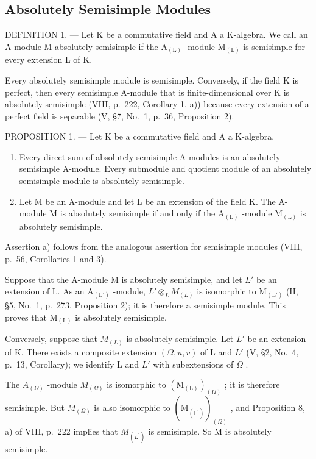 \subsection{Absolutely Semisimple Modules}

DEFINITION 1. --- Let K be a commutative field and A a K-algebra. We call an A-module M absolutely semisimple if the \(\mathrm{A}_{(\mathrm{L})}\) -module \(\mathrm{M}_{(\mathrm{L})}\) is semisimple for every extension L of K.

Every absolutely semisimple module is semisimple. Conversely, if the field K is perfect, then every semisimple A-module that is finite-dimensional over K is absolutely semisimple (VIII, p.~222, Corollary 1, a)) because every extension of a perfect field is separable (V, §7, No.~1, p.~36, Proposition 2).

PROPOSITION 1. --- Let K be a commutative field and A a K-algebra.

\begin{enumerate}
\def\labelenumi{\alph{enumi})}
\item
  Every direct sum of absolutely semisimple A-modules is an absolutely semisimple A-module. Every submodule and quotient module of an absolutely semisimple module is absolutely semisimple.
\item
  Let M be an A-module and let L be an extension of the field K. The A-module M is absolutely semisimple if and only if the \(\mathrm{A}_{(\mathrm{L})}\) -module \(\mathrm{M}_{(\mathrm{L})}\) is absolutely semisimple.
\end{enumerate}

Assertion a) follows from the analogous assertion for semisimple modules (VIII, p.~56, Corollaries 1 and 3).

Suppose that the A-module M is absolutely semisimple, and let \(L'\) be an extension of L. As an \(\mathrm{A}_{(\mathrm{L}')}\) -module, \(L' \otimes_{L} M_{(L)}\) is isomorphic to \(\mathrm{M}_{(\mathrm{L}')}\) (II, §5, No.~1, p.~273, Proposition 2); it is therefore a semisimple module. This proves that \(\mathrm{M}_{(\mathrm{L})}\) is absolutely semisimple.

Conversely, suppose that \(M_{(L)}\) is absolutely semisimple. Let \(L'\) be an extension of K. There exists a composite extension \((\Omega, u, v)\) of L and \(L'\) (V, §2, No.~4, p.~13, Corollary); we identify L and \(L'\) with subextensions of \(\Omega\) .

The \(A_{(\Omega)}\) -module \(M_{(\Omega)}\) is isomorphic to \((\mathrm{M}_{(\mathrm{L})})_{(\Omega)}\) ; it is therefore semisimple. But \(M_{(\Omega)}\) is also isomorphic to \((\mathrm{M}_{(\mathrm{L}^{\prime})})_{(\Omega)}\) , and Proposition 8, a) of VIII, p.~222 implies that \(M_{(L^{\prime})}\) is semisimple. So M is absolutely semisimple.

